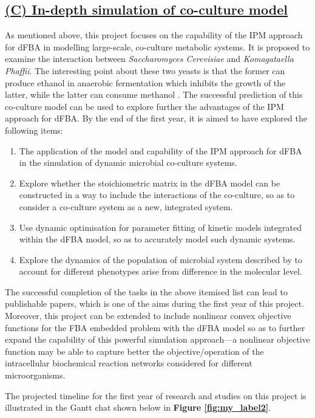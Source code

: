 \documentclass[11pt,a4paper,english]{article}
\begin{document}
\subsection*{\underline{(C) In-depth simulation of co-culture model}}
\label{sec:subsecC}
As mentioned above, this project focuses on the capability of the IPM approach for dFBA in modelling large-scale, co-culture metabolic systems. It is proposed to examine the interaction between \textit{Saccharomyces Cerevisiae} and \textit{Komagataella Phaffii}. The interesting point about these two yeasts is that the former can produce ethanol in anaerobic fermentation which inhibits the growth of the latter, while the latter can consume methanol \citep{tuttle1995divergent}. The successful prediction of this co-culture model can be used to explore further the advantages of the IPM approach for dFBA. By the end of the first year, it is aimed to have explored the following items:
\begin{enumerate}
    \item 
The application of the model and capability of the IPM approach for dFBA in the simulation of dynamic microbial co-culture systems.
    \item
Explore whether the stoichiometric matrix in the dFBA model can be constructed in a way to include the interactions of the co-culture, so as to consider a co-culture system as a new, integrated system.
    \item
    Use dynamic optimisation for parameter fitting of kinetic models integrated within the dFBA model, so as to accurately model such dynamic systems.
    \item
Explore the dynamics of the population of microbial system described by \citet{lee2009individual} to account for different phenotypes arise from difference in the molecular level.
\end{enumerate}
The successful completion of the tasks in the above itemised list can lead to publishable papers, which is one of the aims during the first year of this project. Moreover, this project can be extended to include nonlinear convex objective functions for the FBA embedded problem with the dFBA model so as to further expand the capability of this powerful simulation approach—a nonlinear objective function may be able to capture better the objective/operation of the intracellular biochemical reaction networks considered for different microorganisms.

The projected timeline for the first year of research and studies on this project is illustrated in the Gantt chat shown below in \textbf{Figure \ref{fig:my_label2}}.
\end{document}
